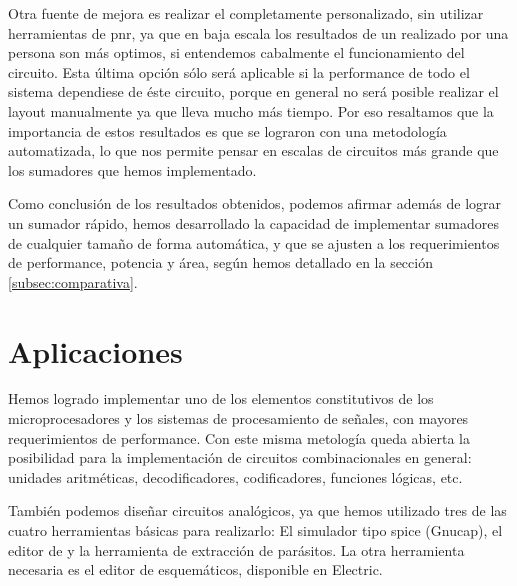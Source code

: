 Otra fuente de mejora es realizar el \layout completamente personalizado, sin utilizar herramientas de \gls{pnr}, ya que en baja escala los resultados de un \layout realizado por una persona son más optimos, si entendemos cabalmente el funcionamiento del circuito. Esta última opción sólo será aplicable si la performance de todo el sistema dependiese de éste circuito, porque en general no será posible realizar el layout manualmente ya que lleva mucho más tiempo. Por eso resaltamos que la importancia de estos resultados es que se lograron con una metodología automatizada, lo que nos permite pensar en escalas de circuitos más grande que los sumadores que hemos implementado.

Como conclusión de los resultados obtenidos, podemos afirmar además de lograr un sumador rápido, hemos desarrollado la capacidad de implementar sumadores de cualquier tamaño de forma automática, y que se ajusten a los requerimientos de performance, potencia y área,  según hemos detallado en la sección \ref{subsec:comparativa}.


\section{Aplicaciones}
Hemos logrado implementar uno de los elementos constitutivos de los microprocesadores y los sistemas de procesamiento de señales, con mayores requerimientos de performance. Con este misma metología queda abierta la posibilidad para la implementación de circuitos combinacionales en general: unidades aritméticas, decodificadores, codificadores, funciones lógicas, etc. 

También podemos diseñar circuitos analógicos, ya que hemos utilizado tres de las cuatro herramientas básicas para realizarlo: El simulador tipo spice (Gnucap), el editor de \layout y la herramienta de extracción de parásitos. La otra herramienta necesaria es el editor de esquemáticos, disponible en Electric.





